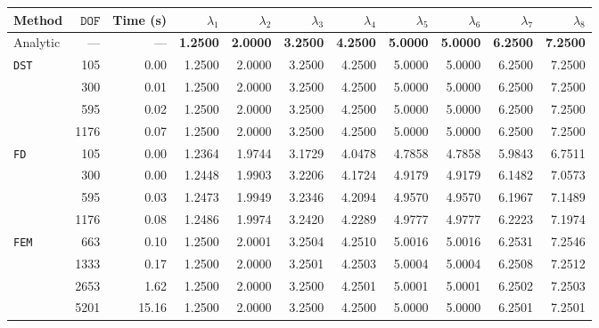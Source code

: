 %

\begin{table}[htbp]
  \centering
  {\scriptsize
  \begin{tabular}{lrrrrrrrrrr}
    \toprule
    Method & $\mathtt{DOF}$ & Time (s) & $\lambda_{1}$ & $\lambda_{2}$ & $\lambda_{3}$ & $\lambda_{4}$ & $\lambda_{5}$ & $\lambda_{6}$ & $\lambda_{7}$ & $\lambda_{8}$ \\
    \midrule
    Analytic & --- & --- & \textbf{1.2500} & \textbf{2.0000} & \textbf{3.2500} & \textbf{4.2500} & \textbf{5.0000} & \textbf{5.0000} & \textbf{6.2500} & \textbf{7.2500} \\
    \midrule
    \multirow{4}{*}{\texttt{DST}} & 105 & 0.00 & 1.2500 & 2.0000 & 3.2500 & 4.2500 & 5.0000 & 5.0000 & 6.2500 & 7.2500 \\
     & 300 & 0.01 & 1.2500 & 2.0000 & 3.2500 & 4.2500 & 5.0000 & 5.0000 & 6.2500 & 7.2500 \\
     & 595 & 0.02 & 1.2500 & 2.0000 & 3.2500 & 4.2500 & 5.0000 & 5.0000 & 6.2500 & 7.2500 \\
     & 1176 & 0.07 & 1.2500 & 2.0000 & 3.2500 & 4.2500 & 5.0000 & 5.0000 & 6.2500 & 7.2500 \\
    \midrule
    \multirow{4}{*}{\texttt{FD}} & 105 & 0.00 & 1.2364 & 1.9744 & 3.1729 & 4.0478 & 4.7858 & 4.7858 & 5.9843 & 6.7511 \\
     & 300 & 0.00 & 1.2448 & 1.9903 & 3.2206 & 4.1724 & 4.9179 & 4.9179 & 6.1482 & 7.0573 \\
     & 595 & 0.03 & 1.2473 & 1.9949 & 3.2346 & 4.2094 & 4.9570 & 4.9570 & 6.1967 & 7.1489 \\
     & 1176 & 0.08 & 1.2486 & 1.9974 & 3.2420 & 4.2289 & 4.9777 & 4.9777 & 6.2223 & 7.1974 \\
    \midrule
    \multirow{4}{*}{\texttt{FEM}} & 663 & 0.10 & 1.2500 & 2.0001 & 3.2504 & 4.2510 & 5.0016 & 5.0016 & 6.2531 & 7.2546 \\
     & 1333 & 0.17 & 1.2500 & 2.0000 & 3.2501 & 4.2503 & 5.0004 & 5.0004 & 6.2508 & 7.2512 \\
     & 2653 & 1.62 & 1.2500 & 2.0000 & 3.2500 & 4.2501 & 5.0001 & 5.0001 & 6.2502 & 7.2503 \\
     & 5201 & 15.16 & 1.2500 & 2.0000 & 3.2500 & 4.2500 & 5.0000 & 5.0000 & 6.2501 & 7.2501 \\

\end{tabular}}
\end{table}
